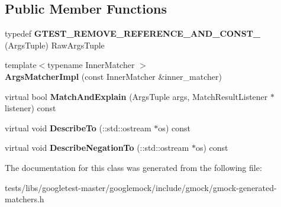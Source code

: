 \subsection*{Public Member Functions}
\begin{DoxyCompactItemize}
\item 
\mbox{\label{classtesting_1_1internal_1_1ArgsMatcherImpl_a7b0cadc369c0c20cd254cc2052782301}} 
typedef {\bfseries G\+T\+E\+S\+T\+\_\+\+R\+E\+M\+O\+V\+E\+\_\+\+R\+E\+F\+E\+R\+E\+N\+C\+E\+\_\+\+A\+N\+D\+\_\+\+C\+O\+N\+S\+T\+\_\+} (Args\+Tuple) Raw\+Args\+Tuple
\item 
\mbox{\label{classtesting_1_1internal_1_1ArgsMatcherImpl_a7f7a9a826d130d11fe30633d79f59a06}} 
{\footnotesize template$<$typename Inner\+Matcher $>$ }\\{\bfseries Args\+Matcher\+Impl} (const Inner\+Matcher \&inner\+\_\+matcher)
\item 
\mbox{\label{classtesting_1_1internal_1_1ArgsMatcherImpl_a60383b3073a61f9d82cbf31fe19e6bfa}} 
virtual bool {\bfseries Match\+And\+Explain} (Args\+Tuple args, Match\+Result\+Listener $\ast$listener) const
\item 
\mbox{\label{classtesting_1_1internal_1_1ArgsMatcherImpl_a8e057f67b368f7d94aeb0ddd35837c94}} 
virtual void {\bfseries Describe\+To} (\+::std\+::ostream $\ast$os) const
\item 
\mbox{\label{classtesting_1_1internal_1_1ArgsMatcherImpl_ac8ff5369879836567cedb5434bcca5b9}} 
virtual void {\bfseries Describe\+Negation\+To} (\+::std\+::ostream $\ast$os) const
\end{DoxyCompactItemize}


The documentation for this class was generated from the following file\+:\begin{DoxyCompactItemize}
\item 
tests/libs/googletest-\/master/googlemock/include/gmock/gmock-\/generated-\/matchers.\+h\end{DoxyCompactItemize}
